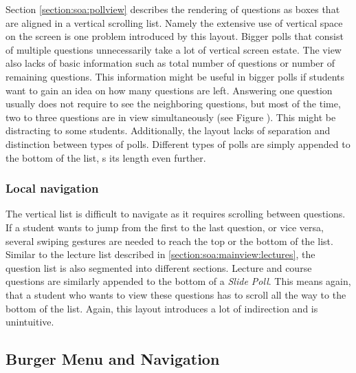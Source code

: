 Section \ref{section:soa:pollview} describes the rendering of questions as boxes that are aligned in a vertical scrolling list. Namely the extensive use of vertical space on the screen is one problem introduced by this layout. Bigger polls that consist of multiple questions unnecessarily take a lot of vertical screen estate. The view also lacks of basic information such as total number of questions or number of remaining questions. This information might be useful in bigger polls if students want to gain an idea on how many questions are left.
Answering one question usually does not require to see the neighboring questions, but most of the time, two to three questions are in view simultaneously (see Figure \todosct). This might be distracting to some students.
\todogrf
Additionally, the layout lacks of separation and distinction between types of polls.
Different types of polls are simply appended to the bottom of the list, s its length even further.
\todogrf
\subsubsection{Local navigation}

The vertical list is difficult to navigate as it requires scrolling between questions. If a student wants to jump from the first to the last question,  or vice versa, several swiping gestures are needed to reach the top or the bottom of the list.
Similar to the lecture list described in \ref{section:soa:mainview:lectures}, the question list is also segmented into different sections. Lecture and course questions are similarly appended to the bottom of a \emph{Slide Poll}. This means again, that a student who wants to view these questions has to scroll all the way to the bottom of the list. Again, this layout introduces a lot of indirection and is unintuitive.


\subsection{Burger Menu and Navigation}
\label{section:con:problems:navigation}

